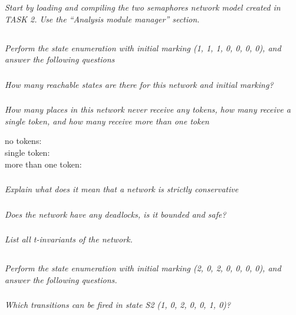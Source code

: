 \documentclass[letterpaper]{article}
\begin{document}
\textit{Start by loading and compiling the two semaphores network model created in TASK 2. Use the “Analysis module manager” section.}

\subsection{}
\textit{Perform the state enumeration with initial marking (1, 1, 1, 0, 0, 0, 0), and answer the following questions}

\subsubsection{}
\textit{How many reachable states are there for this network and initial marking?}

\subsubsection{}
\textit{How many places in this network never receive any tokens, how many receive a single token, and how many receive more than one token}

no tokens: \\
single token: \\
more than one token: \\

\subsubsection{}
\textit{Explain what does it mean that a network is strictly conservative}

\subsubsection{}
\textit{Does the network have any deadlocks, is it bounded and safe?}

\subsubsection{}
\textit{List all t-invariants of the network.}

\subsection{}
\textit{Perform the state enumeration with initial marking (2, 0, 2, 0, 0, 0, 0), and answer the following questions.}

\subsubsection{}
\textit{Which transitions can be fired in state S2 (1, 0, 2, 0, 0, 1, 0)?}
\end{document}
